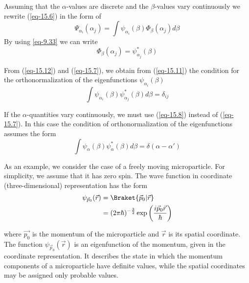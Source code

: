 \documentclass[a4paper,sfsidenotes,colorlinks=true]{tufte-book}
\numberwithin{equation}{section}
\numberwithin{figure}{section}
\begin{document}
Assuming that the $\alpha$-values are discrete and the $\beta$-values vary
continuously we rewrite (\ref{eq-15.6}) in the form of
\begin{equation}%
\Psi_{\alpha_{i}}(\alpha_{j}) = \int \psi_{\alpha_{i}} (\beta)
\Phi_{\beta} (\alpha_{j})  d \beta
\label{eq-15.11}
\end{equation}
By using \ref{eq-9.33} we can write
\begin{equation}%
\Phi_{\beta} (\alpha_{j}) = \psi_{\alpha_{j}}^{*} (\beta)
\label{eq-15.12}
\end{equation}

From (\ref{eq-15.12}) and (\ref{eq-15.7}), we obtain from (\ref{eq-15.11}) the condition
for the orthonormalization of the eigenfunctions $\psi_{\alpha_{i}}(\beta)$
\begin{equation}%
\int \psi_{\alpha_{i}}(\beta) \psi_{\alpha_{j}}^{*} (\beta) d \beta = \delta_{ij}
\label{eq-15.13}
\end{equation}

If the $\alpha$-quantities vary continuously, we must use (\ref{eq-15.8}) instead of
(\ref{eq-15.7}). In this case the condition of orthonormalization of the
eigenfunctions assumes the form
\begin{equation}%
\int \psi_{\alpha}(\beta) \psi_{\alpha}^{*} (\beta) d \beta = \delta
(\alpha - \alpha')
\label{eq-15.14}
\end{equation}


As an 
example, we consider the case of a freely moving microparticle. For
simplicity, we assume that it has zero spin. The wave function in
coordinate (three-dimensional) representation has the form
\begin{equation}%
\begin{split}
 \psi_{\vec{p}_{0}} (\vec{r}) & = \Braket{\vec{p}_{0}| \vec{r}} \\
& = (2 \pi \hbar)^{-\frac{3}{2}} \exp \left( \frac{ i \vec{p}_{0} \vec{r}}{\hbar} \right)
\end{split}
\label{eq-15.15}
\end{equation}

where $\vec{p_{0}}$ is the momentum of the microparticle and $\vec{r}$
is its spatial coordinate. The function $ \psi_{\vec{p}_{0}}
(\vec{r})$ is an eigenfunction of the momentum, given in the
coordinate representation. It describes the state in which the
momentum components of a microparticle have definite values, while the
spatial coordinates may be assigned only probable values.
\end{document}
